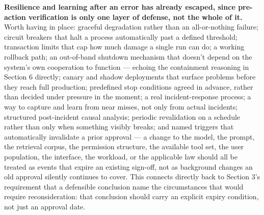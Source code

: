 \textbf{Resilience and learning after an error has already escaped, since pre-action verification is only one layer of defense, not the whole of it.} Worth having in place: graceful degradation rather than an all-or-nothing failure; circuit breakers that halt a process automatically past a defined threshold; transaction limits that cap how much damage a single run can do; a working rollback path; an out-of-band shutdown mechanism that doesn't depend on the system's own cooperation to function --- echoing the containment reasoning in Section 6 directly; canary and shadow deployments that surface problems before they reach full production; predefined stop conditions agreed in advance, rather than decided under pressure in the moment; a real incident-response process; a way to capture and learn from near misses, not only from actual incidents; structured post-incident causal analysis; periodic revalidation on a schedule rather than only when something visibly breaks; and named triggers that automatically invalidate a prior approval --- a change to the model, the prompt, the retrieval corpus, the permission structure, the available tool set, the user population, the interface, the workload, or the applicable law should all be treated as events that expire an existing sign-off, not as background changes an old approval silently continues to cover. This connects directly back to Section 3's requirement that a defensible conclusion name the circumstances that would require reconsideration: that conclusion should carry an explicit expiry condition, not just an approval date.

